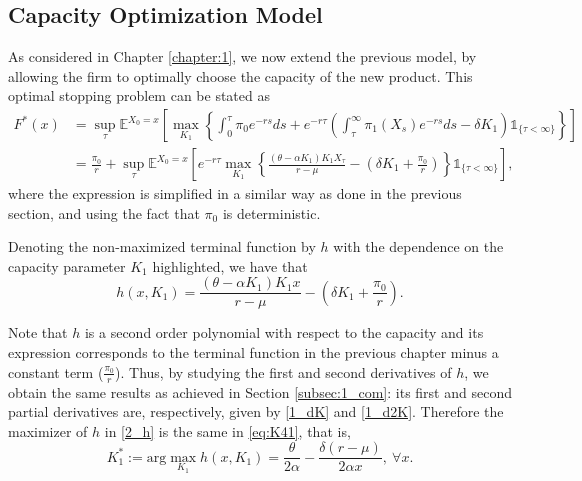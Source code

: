 \subsection{Capacity Optimization Model}
\label{subsec:2_com}

As considered in Chapter \ref{chapter:1}, we now extend the previous model, by allowing the firm to optimally choose the capacity of the new product.
This optimal stopping problem can be stated as
\begin{align}
F^*(x)&=\sup _\tau \mathds{E}^{X_0=x} \left[ \max_{K_1} \left\{ \int_0^\tau \pi_0e^{-rs} ds + e^{-r\tau} \left( \int_\tau^\infty \pi_1(X_s)e^{-rs}ds -\delta K_1 \right) \mathds{1}_{ \{\tau < \infty \} } \right\} \right] \nonumber \\
&= \frac{\pi_0}{r}+ \sup _\tau \mathds{E}^{X_0=x} \left[ e^{-r\tau} \max_{K_1}   \left\{ \frac{(\theta-\alpha K_1)K_1X_\tau}{r-\mu} - \left( \delta K_1  +\frac{\pi_0}{r}\right)   \right\} \mathds{1}_{ \{\tau < \infty \} } \right],
\label{eq:o2}
\end{align}
where the expression is simplified in a similar way as done in the previous section, and using the fact that $\pi_0$ is deterministic.

Denoting the non-maximized terminal function by $h$ with the dependence on the capacity parameter $K_1$ highlighted, we have that
\begin{equation}
h(x,K_1)= \frac{(\theta-\alpha K_1)K_1 x}{r-\mu} - \left( \delta K_1  +\frac{\pi_0}{r}\right).
\label{2_h}
\end{equation}

Note that $h$ is a second order polynomial with respect to the capacity and its expression corresponds to the terminal function in the previous chapter minus a constant term ($\frac{\pi_0}{r}$). Thus, by studying the first and second derivatives of $h$, we obtain the same results as achieved in Section \ref{subsec:1_com}: its first and second partial derivatives are, respectively, given by \eqref{1_dK} and \eqref{1_d2K}. Therefore the maximizer of $h$ in \eqref{2_h} is the same in \eqref{eq:K41}, that is,
\begin{equation}
K^*_1:=\text{arg} \max_{K_1} h(x,K_1) = \frac{\theta}{2\alpha}-\frac{\delta (r-\mu)}{2 \alpha x}, \ \forall x.
\label{eq:Kopt2}
\end{equation}

